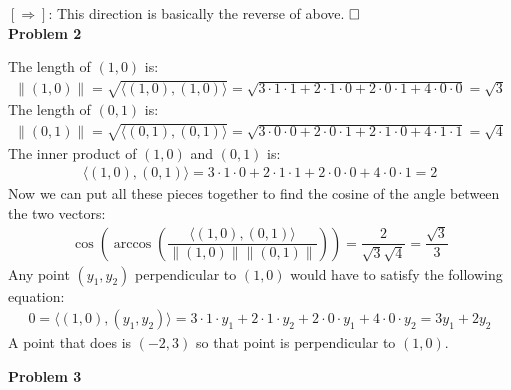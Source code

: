 \documentclass[fleqn]{article}
\newcommand{\problem}[1]{\large\textbf{Problem #1}\normalsize}
\newcommand{\qed}{\hfill\ensuremath{\square}}
\newcommand{\normF}[1]{\left\lVert#1\right\rVert}
\begin{document}
$[\Rightarrow]$: This direction is basically the reverse of above. $\qed$ \\

\problem{2}

The length of $(1,0)$ is:
\begin{align*}
  \normF{(1,0)}
  = \sqrt{\langle (1,0), (1,0) \rangle}
  = \sqrt{3 \cdot 1 \cdot 1 + 2 \cdot 1 \cdot 0 + 2 \cdot 0 \cdot 1 + 4 \cdot 0 \cdot 0}
  = \sqrt{3}
\end{align*}
The length of $(0,1)$ is:
\begin{align*}
  \normF{(0,1)}
  = \sqrt{\langle (0,1), (0,1) \rangle}
  = \sqrt{3 \cdot 0 \cdot 0 + 2 \cdot 0 \cdot 1 + 2 \cdot 1 \cdot 0 + 4 \cdot 1 \cdot 1}
  = \sqrt{4}
\end{align*}
The inner product of $(1, 0)$ and $(0, 1)$ is:
\begin{align*}
  \langle (1, 0), (0, 1) \rangle
  = 3 \cdot 1 \cdot 0 + 2 \cdot 1 \cdot 1 + 2 \cdot 0 \cdot 0 + 4 \cdot 0 \cdot 1
  = 2
\end{align*}
Now we can put all these pieces together to find the cosine of the angle between
the two vectors:
\begin{align*}
  \cos{\left ( \arccos{\left ( \dfrac{\langle (1, 0), (0,1) \rangle}{\normF{(1, 0)}\normF{(0,1)}}\right ) }\right )}
  = \dfrac{2}{\sqrt{3}\sqrt{4}}
  = \dfrac{\sqrt{3}}{3}
\end{align*}
Any point $(y_1, y_2)$ perpendicular to $(1, 0)$ would have to satisfy the
following equation:
\begin{align*}
  0 = \langle (1, 0), (y_1, y_2) \rangle
  = 3 \cdot 1 \cdot y_1 + 2 \cdot 1 \cdot y_2 + 2 \cdot 0 \cdot y_1 + 4 \cdot 0 \cdot y_2 
  = 3 y_1 + 2 y_2
\end{align*}
A point that does is $(-2, 3)$ so that point is perpendicular to $(1, 0)$. \\

\newpage

\problem{3}
\end{document}
